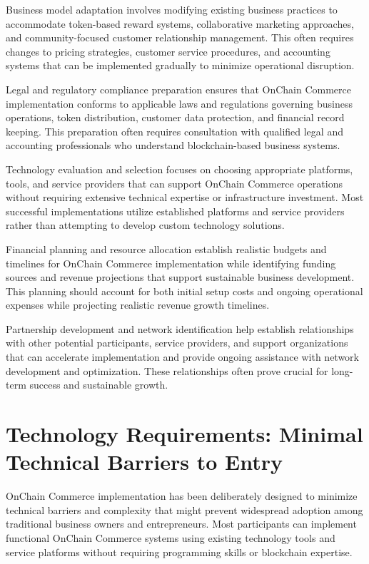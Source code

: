 \documentclass[
  Letterpaper,
]{scrbook}
\begin{document}
Business model adaptation involves modifying existing business practices
to accommodate token-based reward systems, collaborative marketing
approaches, and community-focused customer relationship management. This
often requires changes to pricing strategies, customer service
procedures, and accounting systems that can be implemented gradually to
minimize operational disruption.

Legal and regulatory compliance preparation ensures that OnChain
Commerce implementation conforms to applicable laws and regulations
governing business operations, token distribution, customer data
protection, and financial record keeping. This preparation often
requires consultation with qualified legal and accounting professionals
who understand blockchain-based business systems.

Technology evaluation and selection focuses on choosing appropriate
platforms, tools, and service providers that can support OnChain
Commerce operations without requiring extensive technical expertise or
infrastructure investment. Most successful implementations utilize
established platforms and service providers rather than attempting to
develop custom technology solutions.

Financial planning and resource allocation establish realistic budgets
and timelines for OnChain Commerce implementation while identifying
funding sources and revenue projections that support sustainable
business development. This planning should account for both initial
setup costs and ongoing operational expenses while projecting realistic
revenue growth timelines.

Partnership development and network identification help establish
relationships with other potential participants, service providers, and
support organizations that can accelerate implementation and provide
ongoing assistance with network development and optimization. These
relationships often prove crucial for long-term success and sustainable
growth.

\section{Technology Requirements: Minimal Technical Barriers to
Entry}\label{technology-requirements-minimal-technical-barriers-to-entry}

OnChain Commerce implementation has been deliberately designed to
minimize technical barriers and complexity that might prevent widespread
adoption among traditional business owners and entrepreneurs. Most
participants can implement functional OnChain Commerce systems using
existing technology tools and service platforms without requiring
programming skills or blockchain expertise.
\end{document}

